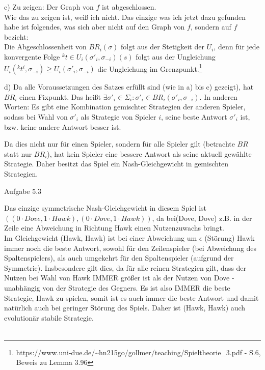 \documentclass{scrartcl}
\begin{document}
c) Zu zeigen: Der Graph von $f$ ist abgeschlossen. \\

Wie das zu zeigen ist, weiß ich nicht. Das einzige was ich jetzt dazu gefunden habe ist folgendes, was sich
aber nicht auf den Graph von $f$, sondern auf $f$ bezieht: \\

Die Abgeschlossenheit von $BR_i(\sigma)$ folgt aus der Stetigkeit der $U_i$, denn für jede konvergente
Folge $^{k}t \in U_i(\sigma'_i, \sigma_{-i})(s)$ folgt aus der Ungleichung $U_i(^{k}t^{i}, \sigma_{-i})
\geq U_i(\sigma'_i, \sigma_{-i})$ die Ungleichung im Grenzpunkt.\footnote{
https://www.uni-due.de/\~{}hn215go/gollmer/teaching/Spieltheorie\_3.pdf - S.6, Beweis zu
Lemma 3.96}

d) Da alle Voraussetzungen des Satzes erfüllt sind (wie in a) bis c) gezeigt), hat $BR_i$ einen Fixpunkt.
Das heißt $\exists \sigma'_i \in \Sigma_i : \sigma'_i \in BR_i(\sigma'_i, \sigma_{-i})$. In anderen
Worten: Es gibt eine Kombination gemischter Strategien der anderen Spieler, sodass bei Wahl von $\sigma'_i$
als Strategie von Spieler $i$, seine beste Antwort $\sigma'_i$ ist, bzw. keine andere Antwort besser ist.

Da dies nicht nur für einen Spieler, sondern für alle Spieler gilt (betrachte $BR$ statt nur $BR_i$), hat
kein Spieler eine bessere Antwort als seine aktuell gewählte Strategie. Daher besitzt das Spiel ein
Nash-Gleichgewicht in gemischten Strategien. \\

\begin{Large}
Aufgabe 5.3\\[0.0cm]
\end{Large}

Das einzige symmetrische Nash-Gleichgewicht in diesem Spiel ist $((0 \cdot Dove, 1 \cdot Hawk),(0 \cdot
Dove, 1 \cdot Hawk))$, da bei(Dove, Dove) z.B. in der Zeile eine Abweichung in Richtung Hawk einen
Nutzenzuwachs bringt. \\

Im Gleichgewicht (Hawk, Hawk) ist bei einer Abweichung um $\epsilon$ (Störung) Hawk immer noch die beste
Antwort, sowohl für den Zeilenspieler (bei Abweichung des Spaltenspielers), als auch umgekehrt für den
Spaltenspieler (aufgrund der Symmetrie). Insbesondere gilt dies, da für alle reinen Strategien gilt, dass
der Nutzen bei Wahl von Hawk IMMER größer ist als der Nutzen von Dove - unabhängig von der Strategie des
Gegners. Es ist also IMMER die beste Strategie, Hawk zu spielen, somit ist es auch immer die beste Antwort
und damit natürlich auch bei geringer Störung des Spiels. Daher ist (Hawk, Hawk) auch evolutionär
stabile Strategie. \\ \\
\end{document}
